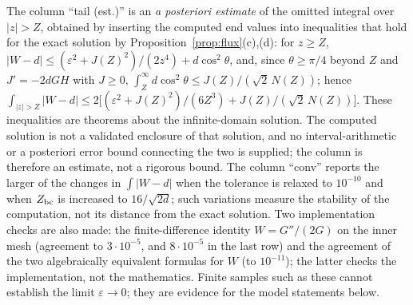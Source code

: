 \documentclass[11pt,a4paper]{article}
\theoremstyle{plain}
\theoremstyle{definition}
\theoremstyle{remark}
\begin{document}
The column ``tail (est.)'' is an \emph{a posteriori estimate} of the omitted integral over $|z|>Z$, obtained by inserting the computed end values into inequalities that hold for the exact solution by Proposition~\ref{prop:flux}(c),(d): for $z\ge Z$, $|W-d|\le(\varepsilon^2+J(Z)^2)/(2z^4)+d\cos^2\theta$, and, since $\theta\ge\pi/4$ beyond $Z$ and $J'=-2dGH$ with $J\ge0$, $\int_Z^\infty d\cos^2\theta\le J(Z)/(\sqrt2\,N(Z))$; hence $\int_{|z|>Z}|W-d|\le2\big[(\varepsilon^2+J(Z)^2)/(6Z^3)+J(Z)/(\sqrt2\,N(Z))\big]$. These inequalities are theorems about the infinite-domain solution. The computed solution is not a validated enclosure of that solution, and no interval-arithmetic or a posteriori error bound connecting the two is supplied; the column is therefore an estimate, not a rigorous bound. The column ``conv'' reports the larger of the changes in $\int|W-d|$ when the tolerance is relaxed to $10^{-10}$ and when $Z_{\rm bc}$ is increased to $16/\sqrt{2d}$; such variations measure the stability of the computation, not its distance from the exact solution. Two implementation checks are also made: the finite-difference identity $W=G''/(2G)$ on the inner mesh (agreement to $3\cdot10^{-5}$, and $8\cdot10^{-5}$ in the last row) and the agreement of the two algebraically equivalent formulas for $W$ (to $10^{-11}$); the latter checks the implementation, not the mathematics. Finite samples such as these cannot establish the limit $\varepsilon\to0$; they are evidence for the model statements below.

\begin{table}[h]
\centering\footnotesize\setlength{\tabcolsep}{2.6pt}

\caption{Strip model (with $\varepsilon$ already divided by $a$ as in Section~\ref{sec:strip}); generated by \texttt{trench\_model.py --table}. Integrals are over $[-Z,Z]$, $Z=8/\sqrt{2d}$. The fourth column approaches $-2/\pi=-0.63662$ and the fifth approaches $-\sqrt{2d}$ as $\varepsilon$ decreases; the eighth column is the integrated positive part of $W-d$, so the sixth column equals minus the fifth plus twice the eighth. ``tail (est.)'' is the a posteriori estimate of the omitted integral over $|z|>Z$ described in the text (not a validated bound); ``conv'' is the stability check described in the text.}\label{tab:strip}
\end{table}

\begin{table}[h]
\centering\footnotesize\setlength{\tabcolsep}{2.6pt}

\caption{Diagnostics for the same runs, generated by the same script. $J_0/\varepsilon-1$ measures the cancellation of the $\varepsilon^{-2}$ ridge, and the fourth column compares it with $(2/\pi)\sqrt{2d}\,\varepsilon$. $K_\varepsilon:=\max_{|z|\le1}|\varepsilon^2-J^2|/(\varepsilon N)$ is the normalised flux ratio of Lemma~\ref{lem:flux}(a). ``surf'' is $\max_{1/\kappa\le z\le3/\kappa}|G(z)e^{\kappa z}/G(0)-1|$ with $\kappa=\sqrt{2d}$; ``prof'' is $\max_{0\le s\le3}\big|\varepsilon(W-d)(\varepsilon s)/(-(2/\pi)\sqrt{2d})-(1+s^2)^{-2}\big|$. The last three columns are the end values at $Z$ and the relative residual $r:=|J(Z)-N(Z)(\pi/2-\theta(Z))(\kappa+1/Z)|/J(Z)$ of the decay condition there.}\label{tab:diag}
\end{table}
\end{document}
